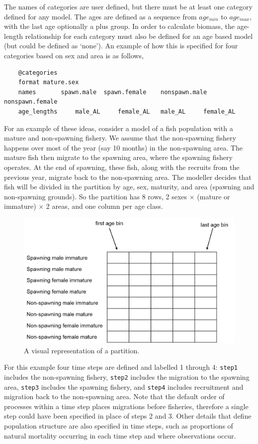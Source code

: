 The names of categories are user defined, but there must be at least one category defined for any model. The ages are defined as a sequence from $age_{min}$ to $age_{max}$, with the last age optionally a plus group. In order to calculate biomass, the age-length relationship for each category must also be defined for an age based model (but could be defined as `none'). An example of how this is specified for four categories based on sex and area is as follows,

{\small{\begin{verbatim}
	@categories 
	format mature.sex 
	names 		spawn.male 	spawn.female 	nonspawn.male 	nonspawn.female
	age_lengths 	male_AL		female_AL   male_AL		female_AL  
\end{verbatim}}}	

For an example of these ideas, consider a model of a fish population with a mature and non-spawning fishery. We assume that the non-spawning fishery happens over most of the year (say 10 months) in the non-spawning area. The mature fish then migrate to the spawning area, where the spawning fishery operates. At the end of spawning, these fish, along with the recruits from the previous year, migrate back to the non-spawning area. The modeller decides that fish will be divided in the partition by age, sex, maturity, and area (spawning and non-spawning grounds). So the partition has 8 rows, 2 sexes $\times$ (mature or immature) $\times$ 2 areas, and one column per age class. 

\begin{figure}[H]
	\centering
	\includegraphics[scale=0.4]{Figures/partition2.png}
		\caption{A visual representation of a partition.}\label{Fig:part}
\end{figure}

For this example four time steps are defined and labelled 1 through 4: \texttt{step1} includes the non-spawning fishery, \texttt{step2} includes the migration to the spawning area, \texttt{step3} includes the spawning fishery, and \texttt{step4} includes recruitment and migration back to the non-spawning area. Note that the default order of processes within a time step places migrations before fisheries, therefore a single step could have been specified in place of steps 2 and 3. Other details that define population structure are also specified in time steps, such as proportions of natural mortality occurring in each time step and where observations occur.

